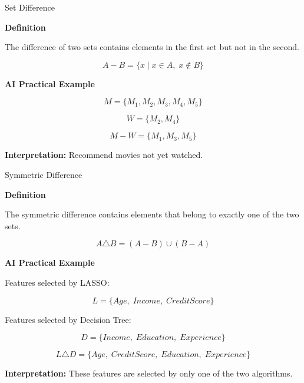 \documentclass[aspectratio=169]{beamer}
\begin{document}
\begin{frame}{Set Difference}

\textbf{Definition}

The difference of two sets contains elements in the first set but not in the second.

\[
A-B=\{x\mid x\in A,\;x\notin B\}
\]

\textbf{AI Practical Example}

\[
M=\{M_1,M_2,M_3,M_4,M_5\}
\]

\[
W=\{M_2,M_4\}
\]

\[
M-W=\{M_1,M_3,M_5\}
\]

\textbf{Interpretation:} Recommend movies not yet watched.



\end{frame}
\begin{frame}{Symmetric Difference}

\textbf{Definition}

The symmetric difference contains elements that belong to exactly one of the two sets.

\[
A\triangle B=(A-B)\cup(B-A)
\]

\vspace{0.3cm}

\textbf{AI Practical Example}

Features selected by LASSO:

\[
L=\{Age,\;Income,\;CreditScore\}
\]

Features selected by Decision Tree:

\[
D=\{Income,\;Education,\;Experience\}
\]

\[
L\triangle D=
\{Age,\;CreditScore,\;Education,\;Experience\}
\]

\textbf{Interpretation:} These features are selected by only one of the two algorithms.

\end{frame}
\end{document}
